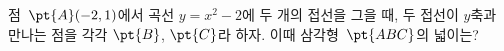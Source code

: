 점~$\pt{A}(-2{,}\mkern3mu\mathopen{}1)$에서 곡선 $y=x^2-2$에 두 개의 접선을 그을 때, 두 접선이 $y$축과 만나는 점을 각각 $\pt{B}$, $\pt{C}$라 하자. 이때 삼각형~$\pt{ABC}$의 넓이는?
